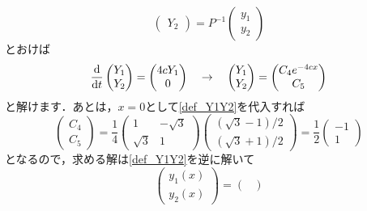 \documentclass[a4paper,pdflatex,ja=standard]{bxjsarticle}
\begin{document}
\begin{enumerate}
\begin{equation}
\begin{pmatrix}
      Y_2
    \end{pmatrix}
    =
    P^{-1}
    \begin{pmatrix}
      y_1 \\
      y_2
    \end{pmatrix}
    \label{def_Y1Y2}
  \end{equation}
  とおけば
  \begin{equation}
    \dv{}{t}
    \begin{pmatrix}
      Y_1 \\
      Y_2
    \end{pmatrix}
    =
    \begin{pmatrix}
      4cY_1 \\
      0
    \end{pmatrix}
    \quad
    \rightarrow
    \quad
    \begin{pmatrix}
      Y_1 \\
      Y_2 
    \end{pmatrix}
    =
    \begin{pmatrix}
      C_4 e^{-4cx} \\
      C_5
    \end{pmatrix}
  \end{equation}
  と解けます．あとは，$x=0$として\eqref{def_Y1Y2}を代入すれば
  \begin{equation}
    \begin{pmatrix}
      C_4 \\
      C_5
    \end{pmatrix}
    =
    \frac{1}{4}
    \begin{pmatrix}
      1 & -\sqrt{3} \\
      \sqrt{3} & 1
    \end{pmatrix}
    \begin{pmatrix}
      (\sqrt{3}-1)/2 \\
      (\sqrt{3}+1)/2
    \end{pmatrix}
    =
    \frac{1}{2}
    \begin{pmatrix}
      -1  \\
      1
    \end{pmatrix}
  \end{equation}
  となるので，求める解は\eqref{def_Y1Y2}を逆に解いて
  \begin{equation}
    \begin{pmatrix}
      y_1(x) \\
      y_2(x)
    \end{pmatrix}
    =
    \begin{pmatrix}

\end{pmatrix}
\end{equation}
\end{enumerate}
\end{document}
